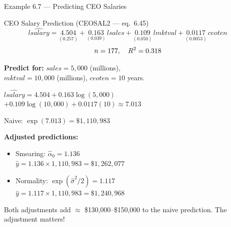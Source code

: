 \documentclass[aspectratio=169, 12pt]{beamer}
\begin{document}
\begin{frame}[shrink=8]{Example 6.7 --- Predicting CEO Salaries}

  \begin{examplebox}{CEO Salary Prediction (CEOSAL2 --- eq.\ 6.45)}
    \[
      \widehat{lsalary} = \underset{(0.257)}{4.504}
        + \underset{(0.039)}{0.163}\, lsales
        + \underset{(0.050)}{0.109}\, lmktval
        + \underset{(0.0053)}{0.0117}\, ceoten
    \]
    \[
      n = 177, \quad R^2 = 0.318
    \]
  \end{examplebox}

  \medskip

      \textbf{Predict for:} $sales = 5{,}000$ (millions), \\
      $mktval = 10{,}000$ (millions), $ceoten = 10$ years.

      \medskip

      $\widehat{lsalary} = 4.504 + 0.163 \log(5{,}000)$
      $+ 0.109 \log(10{,}000) + 0.0117(10) \approx 7.013$

      \medskip

      Naive: $\exp(7.013) = \$1{,}110{,}983$
  \medskip

      \begin{keybox}
        \textbf{Adjusted predictions:}
        \begin{itemize}
          \item Smearing: $\hat\alpha_0 = 1.136$ \\
                $\hat{y} = 1.136 \times 1{,}110{,}983 = \$1{,}262{,}077$
          \item Normality: $\exp(\hat\sigma^2/2) = 1.117$ \\
                $\hat{y} = 1.117 \times 1{,}110{,}983 = \$1{,}240{,}968$
        \end{itemize}

        \medskip

        Both adjustments add $\approx$ \$130,000--\$150,000
        to the naive prediction. The adjustment matters!
      \end{keybox}

\end{frame}
\end{document}

